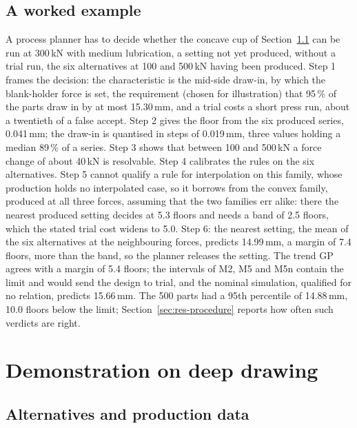 \documentclass[pdflatex,sn-basic,lineno]{sn-jnl}
\begin{document}
\subsection{A worked example}\label{sec:example}

A process planner has to decide whether the concave cup of Section~\ref{sec:data} can be run at 300\,kN with medium lubrication, a setting not yet produced, without a trial run, the six alternatives at 100 and 500\,kN having been produced. Step 1 frames the decision: the characteristic is the mid-side draw-in, by which the blank-holder force is set, the requirement (chosen for illustration) that 95\,\% of the parts draw in by at most 15.30\,mm, and a trial costs a short press run, about a twentieth of a false accept. Step 2 gives the floor from the six produced series, 0.041\,mm; the draw-in is quantised in steps of 0.019\,mm, three values holding a median 89\,\% of a series. Step 3 shows that between 100 and 500\,kN a force change of about 40\,kN is resolvable. Step 4 calibrates the rules on the six alternatives. Step 5 cannot qualify a rule for interpolation on this family, whose production holds no interpolated case, so it borrows from the convex family, produced at all three forces, assuming that the two families err alike: there the nearest produced setting decides at 5.3 floors and needs a band of 2.5 floors, which the stated trial cost widens to 5.0. Step 6: the nearest setting, the mean of the six alternatives at the neighbouring forces, predicts 14.99\,mm, a margin of 7.4 floors, more than the band, so the planner releases the setting. The trend GP agrees with a margin of 5.4 floors; the intervals of M2, M5 and M5n contain the limit and would send the design to trial, and the nominal simulation, qualified for no relation, predicts 15.66\,mm. The 500 parts had a 95th percentile of 14.88\,mm, 10.0 floors below the limit; Section~\ref{sec:res-procedure} reports how often such verdicts are right.

\section{Demonstration on deep drawing}\label{sec:demo}

\subsection{Alternatives and production data}\label{sec:data}
\end{document}
